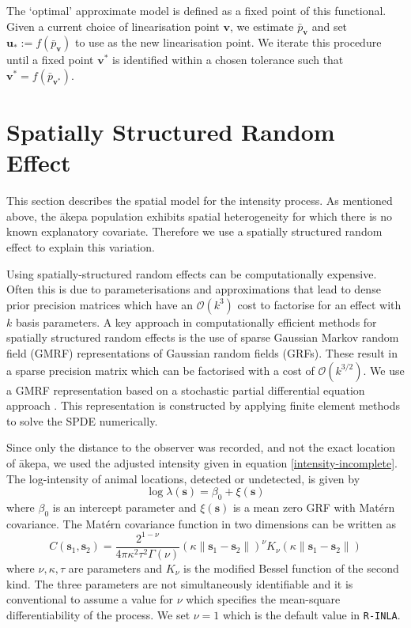 \documentclass{statsoc}
\newcommand{\bs}{\mathbf{s}}
\newcommand{\bm}{\boldsymbol}  %
\newcommand{\akepa}{\textquotesingle\={a}kepa}  %
\begin{document}
The `optimal' approximate model is defined as a fixed point of this functional.  Given a current choice of linearisation point $\bm{v}$, we estimate $\bar{p}_{\bm{v}}$ and set $\bm{u}_* :=f(\bar{p}_{\bm{v}})$ to use as the new linearisation point.  We iterate this procedure until a fixed point $\bm{v}^*$ is identified within a chosen tolerance such that $\bm{v}^* = f(\bar{p}_{\bm{v}^*})$.

\section{Spatially Structured Random Effect}
\label{sec-gmrf}

This section describes the spatial model for the intensity process.  
As mentioned above, the \akepa{} population exhibits spatial heterogeneity for which there is no known explanatory covariate.  Therefore we use a spatially structured random effect to explain this variation.

Using spatially-structured random effects can be computationally expensive.  Often this is due to parameterisations and approximations that lead to dense prior precision matrices which have an  $\mathcal{O}(k^3)$ cost to factorise for an effect with $k$ basis parameters.  A key approach in computationally efficient methods for spatially structured random effects is the use of sparse Gaussian Markov random field (GMRF) representations of Gaussian random fields (GRFs).  These result in a sparse precision matrix which can be factorised with a cost of $\mathcal{O}(k^{3/2})$.  We use a GMRF representation based on a stochastic partial differential equation approach \citep{lindgren_explicit_2011}.  This representation is constructed by applying finite element methods to solve the SPDE numerically.

Since only the distance to the observer was recorded, and not the exact location of \akepa{}, we used the adjusted intensity given in equation \eqref{intensity-incomplete}.  The log-intensity of animal locations, detected or undetected, is given by
\begin{equation*}
\log \lambda(\bs) = \beta_0 + \xi(\bs)
\end{equation*}
where $\beta_0$ is an intercept parameter and $\xi(\bs)$ is a mean zero GRF with Mat\'ern covariance.  The Mat\'ern covariance function in two dimensions can be written as 
\begin{equation}
C(\bs_1,\bs_2) = \frac{2^{1-\nu}}{4\pi\kappa^2\tau^2\Gamma(\nu)}(\kappa \|\bs_1-\bs_2\|)^{\nu}K_\nu(\kappa \|\bs_1-\bs_2\|)
\end{equation}
where \(\nu, \kappa, \tau\) are parameters and \(K_{\nu}\) is the modified Bessel function of the second kind.  The three parameters are not simultaneously identifiable \citep{zhang_inconsistent_2004} and it is conventional to assume a value for $\nu$ which specifies the mean-square differentiability of the process.  We set $\nu = 1$ which is the default value in \texttt{R-INLA}.
\end{document}
